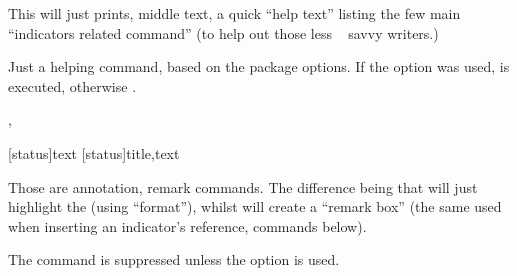 \documentclass[article,nogeometry,english,tocdepth=3,secdepth=3]{ufrgscca} %
\begin{document}
\begin{codedescribe}{\helpindicators}
	\begin{codesyntax}%
	\tsmacro{\helpindicators}{}
\end{codesyntax}
This will just prints, middle text, a quick “help text” listing the few main “indicators related command” (to help out those less \LaTeXe~ savvy writers.)
\end{codedescribe}

\begin{codedescribe}{ \ifshowind}
    \begin{codesyntax}%
    \end{codesyntax}
Just a helping command, based on the package options. If the option  was used,  is executed, otherwise .
\end{codedescribe}


\begin{codedescribe}{\textmark, \comment}
	\begin{codesyntax}%
	\tsmacro{\textmark}[status]{text}
	\tsmacro{\comment}[status]{title,text}
\end{codesyntax}
Those are annotation, remark commands. The difference being that \tsmacro{\textmark}{} will just highlight the  (using  “format”), whilst  will create a “remark box” (the same used when inserting an indicator's reference, commands below).
\begin{tsremark}[N.B.:]
 The command \tsmacro{\comment}{} is suppressed unless the option  is used.
 \end{tsremark}
\end{codedescribe}
\end{document}
